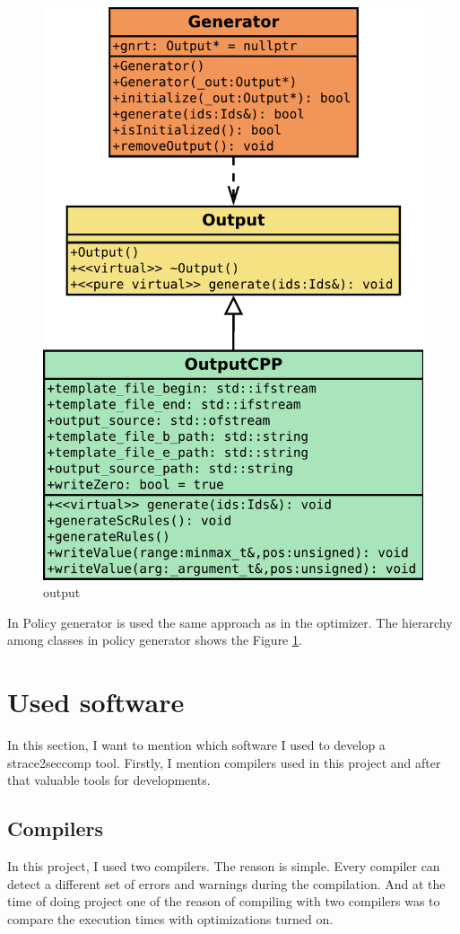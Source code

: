 \begin{figure}[H]
	\centering
	\includegraphics[width=0.65\linewidth]{obrazky-figures/class/output.pdf}
	\caption{output}
	\label{fig:class:output}
\end{figure}
\pagebreak

In Policy generator is used the same approach as in the optimizer. The hierarchy
among classes in policy generator shows the Figure \ref{fig:class:output}.

\section{Used software}
In this section, I want to mention which software I used to develop a strace2seccomp tool.
Firstly, I mention compilers used in this project and after that valuable tools for developments.

\subsection{Compilers}
\label{subsec:compilers}
In this project, I used two compilers. The reason is simple.
Every compiler can detect a different set of errors and warnings during the compilation.
And at the time of doing project one of the reason of compiling with two compilers
was to compare the execution times with optimizations turned on.


